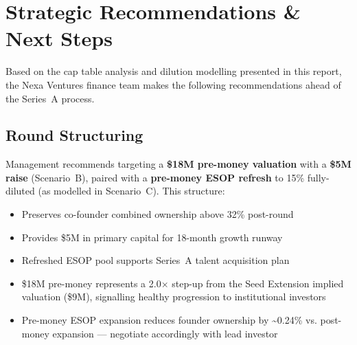 
\section{Strategic Recommendations \& Next Steps}

Based on the cap table analysis and dilution modelling presented in this report, the Nexa
Ventures finance team makes the following recommendations ahead of the Series~A process.

\subsection{Round Structuring}

\begin{tcolorbox}[
  enhanced,
  colback=white,
  colframe=nexaNavy,
  boxrule=1pt,
  arc=4pt,
  title={\faChartBar\;\,Recommended Approach: Scenario B with ESOP Refresh},
  fonttitle=\bfseries\color{white},
  coltitle=white,
  attach boxed title to top left={yshift=-2mm, xshift=5mm},
  boxed title style={colback=nexaNavy}
]
\vspace{4pt}
Management recommends targeting a \textbf{\$18M pre-money valuation} with a
\textbf{\$5M raise} (Scenario~B), paired with a \textbf{pre-money ESOP refresh} to
15\% fully-diluted (as modelled in Scenario~C). This structure:

\begin{itemize}[leftmargin=1.4em, itemsep=3pt]
  \item[\positive] Preserves co-founder combined ownership above 32\% post-round
  \item[\positive] Provides \$5M in primary capital for 18-month growth runway
  \item[\positive] Refreshed ESOP pool supports Series~A talent acquisition plan
  \item[\positive] \$18M pre-money represents a 2.0\(\times\) step-up from the Seed Extension
    implied valuation (\$9M), signalling healthy progression to institutional investors
  \item[\caution] Pre-money ESOP expansion reduces founder ownership by \textasciitilde0.24\%
    vs. post-money expansion --- negotiate accordingly with lead investor
\end{itemize}
\end{tcolorbox}

